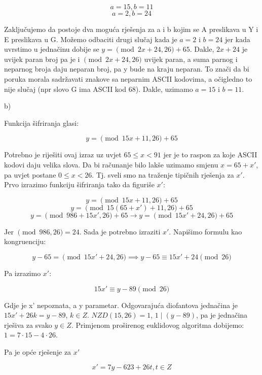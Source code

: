 \documentclass[12pt]{article}
\begin{document}
$$a = 15, b = 11$$
$$a = 2, b = 24$$\vspace{1mm}

Zaključujemo da postoje dva moguća rješenja za a i b kojim se A preslikava u Y i E preslikava u G. Možemo odbaciti drugi slučaj kada je $a = 2$ i $b = 24$ jer kada uvrstimo u jednačinu dobije se $y = \pmod{2x + 24, 26} + 65$. Dakle, $2x + 24$ je uvijek paran broj pa je i $\pmod{2x + 24, 26}$ uvijek paran, a suma parnog i neparnog broja daju neparan broj, pa y bude na kraju neparan. To znači da bi poruka morala sadržavati znakove sa neparnim ASCII kodovima, a očigledno to nije slučaj (npr slovo G ima ASCII kod 68). Dakle, uzimamo $a = 15$ i $b = 11$.\vspace{10mm}

b)

\hspace{0.65cm}Funkcija šifriranja glasi:

$$y = \pmod{15x + 11, 26} + 65$$\vspace{1mm}

Potrebno je riješiti ovaj izraz uz uvjet $65 \leq x < 91$ jer je to raspon za koje ASCII kodovi daju velika slova. Da bi računanje bilo lakše uzimamo smjenu $x = 65 + x'$, pa uvjet postane $0 \leq x < 26$. Tj. sveli smo na traženje tipičnih rješenja za $x'$. Prvo izrazimo funkciju šifriranja tako da figuriše $x'$:

$$y = \pmod{15x + 11, 26} + 65$$
$$y = \pmod{15(65 + x') + 11, 26} + 65$$
$$y = \pmod{986 + 15x', 26} + 65 \to y = \pmod{15x' + 24, 26} + 65$$\vspace{1mm}


Jer $\pmod{986, 26} = 24$. Sada je potrebno izraziti $x'$. Napišimo formulu kao kongruenciju:

$$y - 65  = \pmod{15x' + 24, 26} \implies y - 65 \equiv 15x' + 24 \pmod{26}$$\vspace{1mm}

Pa izrazimo $x'$:

$$15x' \equiv y - 89\pmod{26}$$\vspace{1mm}

Gdje je x' nepoznata, a y parametar. Odgovarajuća diofantova jednačina je $15x' + 26k = y - 89$, $k \in Z$. $NZD(15, 26) = 1$, $1 \mid (y - 89)$, pa je jednačina rješiva za svako $y \in Z$. Primjenom proširenog euklidovog algoritma dobijemo: $1 = 7\cdot 15 - 4\cdot 26$.

Pa je opće rješenje za $x'$

$$x' = 7y - 623 + 26t, t \in Z$$\vspace{1mm}
\end{document}
